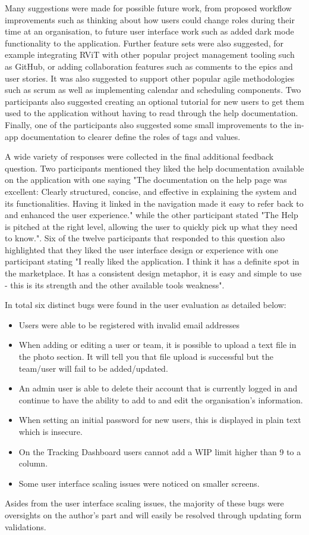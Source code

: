 \documentclass[l4proj.tex]{subfiles}
\begin{document}
Many suggestions were made for possible future work, from proposed workflow improvements such as thinking about how users could change roles during their time at an organisation, to future user interface work such as added dark mode functionality to the application. Further feature sets were also suggested, for example integrating RViT with other popular project management tooling such as GitHub, or adding collaboration features such as comments to the epics and user stories. It was also suggested to support other popular agile methodologies such as scrum as well as implementing calendar and scheduling components. Two participants also suggested creating an optional tutorial for new users to get them used to the application without having to read through the help documentation. Finally, one of the participants also suggested some small improvements to the in-app documentation to clearer define the roles of tags and values.

A wide variety of responses were collected in the final additional feedback question. Two participants mentioned they liked the help documentation available on the application with one saying "The documentation on the help page was excellent: Clearly structured, concise, and effective in explaining the system and its functionalities. Having it linked in the navigation made it easy to refer back to and enhanced the user experience." while the other participant stated "The Help is pitched at the right level, allowing the user to quickly pick up what they need to know.". Six of the twelve participants that responded to this question also highlighted that they liked the user interface design or experience with one participant stating "I really liked the application. I think it has a definite spot in the marketplace. It has a consistent design metaphor, it is easy and simple to use - this is its strength and the other available tools weakness". 


In total six distinct bugs were found in the user evaluation as detailed below:
\begin{itemize}
    \item Users were able to be registered with invalid email addresses
    \item When adding or editing a user or team, it is possible to upload a text file in the photo section. It will tell you that file upload is successful but the team/user will fail to be added/updated.
    \item An admin user is able to delete their account that is currently logged in and continue to have the ability to add to and edit the organisation's information.
    \item When setting an initial password for new users, this is displayed in plain text which is insecure.
    \item On the Tracking Dashboard users cannot add a WIP limit higher than 9 to a column.
    \item Some user interface scaling issues were noticed on smaller screens.
\end{itemize}
Asides from the user interface scaling issues, the majority of these bugs were oversights on the author's part and will easily be resolved through updating form validations. 
\end{document}
